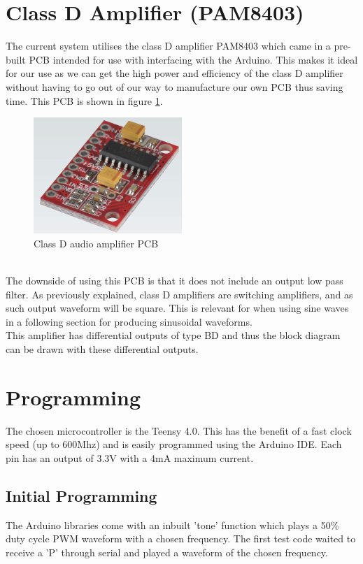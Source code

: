 \documentclass[12pt, a4paper]{article}
\begin{document}
\section{Class D Amplifier (PAM8403)}
The current system utilises the class D amplifier PAM8403 which came in a pre-built PCB intended for use with interfacing with the Arduino. This makes it ideal for our use as we can get the high power and efficiency of the class D amplifier without having to go out of our way to manufacture our own PCB thus saving time. This PCB is shown in figure \ref{fig:classDAmp}. 
\begin{figure} [!htb]
	\hfill\includegraphics[width=0.5\textwidth]{./Figures/Class_D_Amp_Physical}\hspace{\fill}
	\caption{Class D audio amplifier PCB}
	\label{fig:classDAmp}
\end{figure} \\
The downside of using this PCB is that it does not include an output low pass filter. As previously explained, class D amplifiers are switching amplifiers, and as such output waveform will be square. This is relevant for when using sine waves in a following section for producing sinusoidal waveforms. \\

This amplifier has differential outputs of type BD and thus the block diagram can be drawn with these differential outputs.

\pagebreak
\section{Programming}
The chosen microcontroller is the Teensy 4.0. This has the benefit of a fast clock speed (up to 600Mhz) and is easily programmed using the Arduino IDE. Each pin has an output of 3.3V with a 4mA maximum current. \\
\subsection{Initial Programming}
The Arduino libraries come with an inbuilt 'tone' function which plays a 50\%
duty cycle PWM waveform with a chosen frequency. The first test code waited to receive a 'P' through serial and played a waveform of the chosen frequency.
\end{document}
